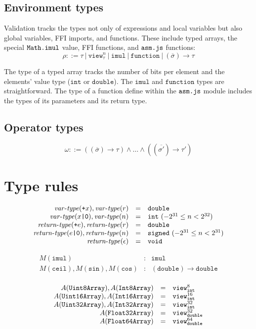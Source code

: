\documentclass{article}
\newcommand{\vartype}{\mathit{var}\mbox{-}\mathit{type}}
\newcommand{\rettype}{\mathit{return}\mbox{-}\mathit{type}}
\newcommand{\funty}[2]{({#1}) \rightarrow {#2}}
\newcommand{\seq}[1]{\overline{{#1}}}
\newcommand{\mathjs}[1]{\mbox{\texttt{{#1}}}}
\newcommand{\mathjssm}[1]{\mbox{\texttt{\scriptsize {#1}}}}
\newcommand{\intsm}{\mathjssm{int}}
\newcommand{\doublesm}{\mathjssm{double}}
\newcommand{\signed}{\mathtt{signed}}
\newcommand{\double}{\mathtt{double}}
\newcommand{\view}[2]{\mathtt{view}^{#1}_{#2}}
\newcommand{\void}{\mathtt{void}}
\newcommand{\todouble}[1]{\mathjs{+}{#1}}
\renewcommand{\int}{\mathtt{int}}
\newcommand{\function}{\mathtt{function}}
\newcommand{\imul}{\mathtt{imul}}
\begin{document}
\subsection{Environment types}

Validation tracks the types not only of expressions and local
variables but also global variables, FFI imports, and functions. These
include typed arrays, the special $\mathjs{Math.imul}$ value, FFI
functions, and $\mathjs{asm.js}$ functions:
\[
\rho ::= \tau ~|~ \view{n}{\tau} ~|~ \imul ~|~ \function ~|~ \funty{\seq{\sigma}}{\tau}
\]

The type of a typed array tracks the number of bits per element and
the elements' value type ($\int$ or $\double$). The $\imul$ and
$\function$ types are straightforward. The type of a function define
within the $\mathjs{asm.js}$ module includes the types of its
parameters and its return type.

\subsection{Operator types}

\[
\omega ::= (\funty{\seq{\sigma}}{\tau}) \land \ldots \land (\funty{\seq{\sigma'}}{\tau'})
\]

\section{Type rules}

\[
\begin{array}{rcl}
\vartype(\todouble{x}), \vartype(r) & = & \double \\
\vartype(x\mathjs{|0}), \vartype(n) & = & \int \mbox{ $(-2^{31} \leq n < 2^{32})$} \\
\rettype(\todouble{e}), \rettype(r) & = & \double \\
\rettype(e\mathjs{|0}), \rettype(n) & = & \signed \mbox{ $(-2^{31} \leq n < 2^{31})$} \\
\rettype(\epsilon)                  & = & \void \\
\end{array}
\]

\[
\begin{array}{rcl}
M(\imul) & : & \imul \\
M(\mathtt{ceil}), M(\mathtt{sin}), M(\mathtt{cos}) & : & \funty{\double}{\double} \\
\end{array}
\]

\[
\begin{array}{rcl}
A(\mathtt{Uint8Array}), A(\mathtt{Int8Array})   & = & \view{8}{\intsm} \\
A(\mathtt{Uint16Array}), A(\mathtt{Int16Array}) & = & \view{16}{\intsm} \\
A(\mathtt{Uint32Array}), A(\mathtt{Int32Array}) & = & \view{32}{\intsm} \\
A(\mathtt{Float32Array})                        & = & \view{32}{\doublesm} \\
A(\mathtt{Float64Array})                        & = & \view{64}{\doublesm} \\
\end{array}
\]
\end{document}
